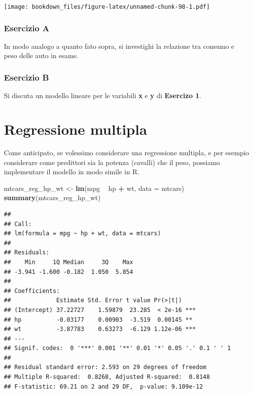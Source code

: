 \documentclass[]{book}
\newenvironment{Shaded}{\begin{snugshade}}{\end{snugshade}}
\newcommand{\DataTypeTok}[1]{\textcolor[rgb]{0.13,0.29,0.53}{#1}}
\newcommand{\KeywordTok}[1]{\textcolor[rgb]{0.13,0.29,0.53}{\textbf{#1}}}
\newcommand{\NormalTok}[1]{#1}
\newcommand{\OperatorTok}[1]{\textcolor[rgb]{0.81,0.36,0.00}{\textbf{#1}}}
\newcommand{\StringTok}[1]{\textcolor[rgb]{0.31,0.60,0.02}{#1}}
\begin{document}
\texttt{[image: bookdown\_files/figure-latex/unnamed-chunk-98-1.pdf]}

\hypertarget{esercizio-a}{%
\subsubsection*{Esercizio A}\label{esercizio-a}}

In modo analogo a quanto fato sopra, si investighi la relazione tra consumo e peso delle auto in esame.

\hypertarget{esercizio-b}{%
\subsubsection*{Esercizio B}\label{esercizio-b}}

Si discuta un modello lineare per le variabili \textbf{x} e \textbf{y} di \textbf{Esercizo 1}.

\hypertarget{regressione-multipla}{%
\section{Regressione multipla}\label{regressione-multipla}}

Come anticipato, se volessimo considerare una regressione multipla, e per esempio considerare come predittori sia la potenza (cavalli) che il peso, possiamo implementare il modello in modo simile in R.

\begin{Shaded}
\begin{Highlighting}[]
\NormalTok{mtcars_reg_hp_wt <-}\StringTok{ }\KeywordTok{lm}\NormalTok{(mpg }\OperatorTok{~}\StringTok{ }\NormalTok{hp }\OperatorTok{+}\StringTok{ }\NormalTok{wt, }\DataTypeTok{data =}\NormalTok{ mtcars)}
\KeywordTok{summary}\NormalTok{(mtcars_reg_hp_wt)}
\end{Highlighting}
\end{Shaded}

\begin{verbatim}
## 
## Call:
## lm(formula = mpg ~ hp + wt, data = mtcars)
## 
## Residuals:
##    Min     1Q Median     3Q    Max 
## -3.941 -1.600 -0.182  1.050  5.854 
## 
## Coefficients:
##             Estimate Std. Error t value Pr(>|t|)    
## (Intercept) 37.22727    1.59879  23.285  < 2e-16 ***
## hp          -0.03177    0.00903  -3.519  0.00145 ** 
## wt          -3.87783    0.63273  -6.129 1.12e-06 ***
## ---
## Signif. codes:  0 '***' 0.001 '**' 0.01 '*' 0.05 '.' 0.1 ' ' 1
## 
## Residual standard error: 2.593 on 29 degrees of freedom
## Multiple R-squared:  0.8268, Adjusted R-squared:  0.8148 
## F-statistic: 69.21 on 2 and 29 DF,  p-value: 9.109e-12
\end{verbatim}
\end{document}
